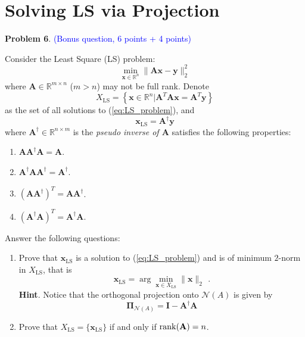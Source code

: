\documentclass[english,onecolumn]{IEEEtran}
\begin{document}
\begin{enumerate}
\end{enumerate}



\newpage
\section{Solving LS via Projection}
\noindent\textbf{Problem 6}. \textcolor{blue}{(Bonus question, 6 points + 4 points)}

Consider the Least Square (LS) problem:
\begin{equation}
    \label{eq:LS_problem}
    \min_{\mathbf{x}\in\mathbb{R}^n}\|\mathbf{A}\mathbf{x}-\mathbf{y}\|_2^2
\end{equation}
where $\mathbf{A}\in\mathbb{R}^{m\times n}$ ($m>n$) may not be full rank. Denote 
\begin{equation*}
    X_{\mathrm{LS}}=\left\{\mathbf{x}\in\mathbb{R}^n| \mathbf{A}^T\mathbf{A}\mathbf{x}=\mathbf{A}^T\mathbf{y}\right\}
\end{equation*}
as the set of all solutions to (\ref{eq:LS_problem}), and 
\begin{equation*}
    \mathbf{x}_{\mathrm{LS}}=\mathbf{A}^\dagger \mathbf{y}
\end{equation*}
where $\mathbf{A}^\dagger\in\mathbb{R}^{n\times m}$ is the \emph{pseudo inverse of $\mathbf{A}$} satisfies the following properties:
\begin{enumerate}
    \item $\mathbf{A}\mathbf{A}^\dagger\mathbf{A}=\mathbf{A}$.
    \item $\mathbf{A}^\dagger\mathbf{A}\mathbf{A}^\dagger=\mathbf{A}^\dagger$.
    \item $(\mathbf{A}\mathbf{A}^\dagger)^T=\mathbf{A}\mathbf{A}^\dagger$.
    \item $(\mathbf{A}^\dagger\mathbf{A})^T=\mathbf{A}^\dagger\mathbf{A}$.
\end{enumerate}

Answer the following questions:
\begin{enumerate}
    \item Prove that $\mathbf{x}_{\mathrm{LS}}$ is a solution to (\ref{eq:LS_problem}) and is of minimum $2$-norm in $X_{\mathrm{LS}}$, that is
    \begin{equation*}
        \mathbf{x}_{\mathrm{LS}}=\arg\min_{\mathbf{x}\in X_{\mathrm{LS}}}\|\mathbf{x}\|_2\  \,.
    \end{equation*}
    \textbf{Hint}. Notice that the orthogonal projection onto $\mathcal{N}(A)$ is given by
    \begin{equation*}
        \mathbf{\Pi}_{\mathcal{N}(A)}=\mathbf{I}-\mathbf{A}^\dagger\mathbf{A}
    \end{equation*}
    
    \item Prove that $X_{\mathrm{LS}}=\{\mathbf{x}_{\mathrm{LS}}\}$ if and only if $\mathrm{rank}({\bf A})=n$.
\end{enumerate}
\end{document}
